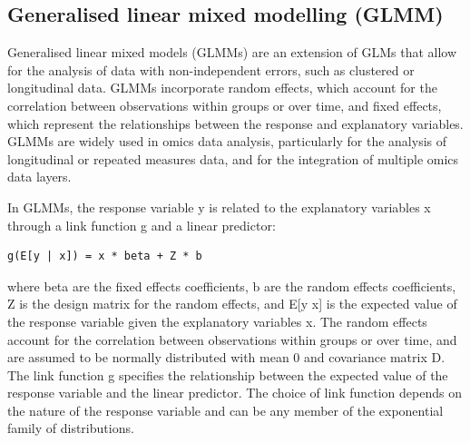 \documentclass[
]{book}
\newenvironment{Shaded}{\begin{snugshade}}{\end{snugshade}}
\newcommand{\AttributeTok}[1]{\textcolor[rgb]{0.77,0.63,0.00}{#1}}
\newcommand{\CommentTok}[1]{\textcolor[rgb]{0.56,0.35,0.01}{\textit{#1}}}
\newcommand{\FunctionTok}[1]{\textcolor[rgb]{0.00,0.00,0.00}{#1}}
\newcommand{\NormalTok}[1]{#1}
\newcommand{\OtherTok}[1]{\textcolor[rgb]{0.56,0.35,0.01}{#1}}
\newcommand{\SpecialCharTok}[1]{\textcolor[rgb]{0.00,0.00,0.00}{#1}}
\newcommand{\StringTok}[1]{\textcolor[rgb]{0.31,0.60,0.02}{#1}}
\begin{document}
\begin{Shaded}
\end{Shaded}

\hypertarget{generalised-linear-mixed-modelling}{%
\subsection{Generalised linear mixed modelling (GLMM)}\label{generalised-linear-mixed-modelling}}

Generalised linear mixed models (GLMMs) are an extension of GLMs that allow for the analysis of data with non-independent errors, such as clustered or longitudinal data. GLMMs incorporate random effects, which account for the correlation between observations within groups or over time, and fixed effects, which represent the relationships between the response and explanatory variables. GLMMs are widely used in omics data analysis, particularly for the analysis of longitudinal or repeated measures data, and for the integration of multiple omics data layers.

In GLMMs, the response variable y is related to the explanatory variables x through a link function g and a linear predictor:

\begin{verbatim}
g(E[y | x]) = x * beta + Z * b
\end{verbatim}

where beta are the fixed effects coefficients, b are the random effects coefficients, Z is the design matrix for the random effects, and E{[}y \textbar{} x{]} is the expected value of the response variable given the explanatory variables x. The random effects account for the correlation between observations within groups or over time, and are assumed to be normally distributed with mean 0 and covariance matrix D. The link function g specifies the relationship between the expected value of the response variable and the linear predictor. The choice of link function depends on the nature of the response variable and can be any member of the exponential family of distributions.
\end{document}
